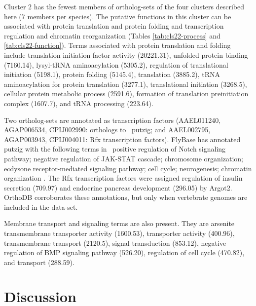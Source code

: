 

Cluster 2 has the fewest members of ortholog-sets of the four clusters described here (7 members per species).
%
The putative functions in this cluster can be associated with protein translation and protein folding and transcription regulation and chromatin reorganization (Tables \ref{tab:cls22-process} and \ref{tab:cls22-function}).
%
Terms associated with protein translation and folding include translation initiation factor activity (20221.31), unfolded protein binding (7160.14), lysyl-tRNA aminoacylation (5305.2), regulation of translational initiation (5198.1), protein folding (5145.4), translation (3885.2), tRNA aminoacylation for protein translation (3277.1), translational initiation (3268.5), cellular protein metabolic process (2591.6), formation of translation preinitiation complex (1607.7), and tRNA processing (223.64).




Two ortholog-sets are annotated as transcription factors (AAEL011240, AGAP006534, CPIJ002990: orthologs to \Dm\ putzig; and AAEL002795, AGAP003943, CPIJ004011: Rfx transcription factors).
%
FlyBase has annotated putzig with the following terms in \Dm\, positive regulation of Notch signaling pathway; negative regulation of JAK-STAT cascade; chromosome organization; ecdysone receptor-mediated signaling pathway; cell cycle; neurogenesis; chromatin organization \cite{Marygold2013}.
%
The Rfx transcription factors were assigned regulation of insulin secretion (709.97) and endocrine pancreas development (296.05) by \gls{Argot2}.
%
OrthoDB corroborates these annotations, but only when vertebrate genomes are included in the data-set.

Membrane transport and signaling terms are also present.
%
They are arsenite transmembrane transporter activity (1600.53), transporter activity (400.96), transmembrane transport (2120.5), signal transduction (853.12), negative regulation of BMP signaling pathway (526.20), regulation of cell cycle (470.82), and transport (288.59).








\section{Discussion} \label{chap:4-sec:discussion}


